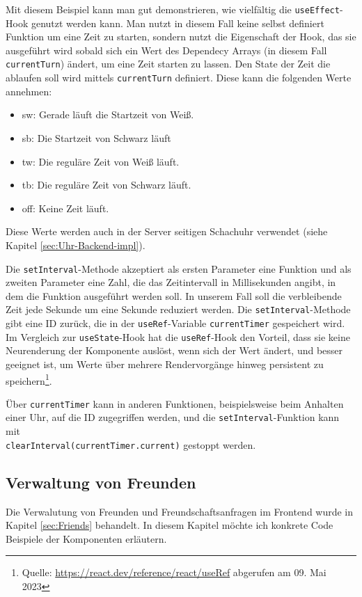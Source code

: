 Mit diesem Beispiel kann man gut demonstrieren, wie vielfältig die \verb|useEffect|-Hook genutzt werden kann. Man nutzt in diesem Fall keine selbst definiert Funktion um eine Zeit zu starten, sondern nutzt die Eigenschaft der Hook, das sie ausgeführt wird sobald sich ein Wert des Dependecy Arrays (in diesem Fall \verb|currentTurn|) ändert, um eine Zeit starten zu lassen. Den State der Zeit die ablaufen soll wird mittels \verb|currentTurn| definiert. Diese kann die folgenden Werte annehmen:

\begin{itemize}
\item \glqq sw\grqq : Gerade läuft die Startzeit von Weiß.
\item \glqq sb\grqq : Die Startzeit von Schwarz läuft
\item \glqq tw\grqq : Die reguläre Zeit von Weiß läuft.
\item \glqq tb\grqq : Die reguläre Zeit von Schwarz läuft.
\item \glqq off\grqq : Keine Zeit läuft.
\end{itemize}

Diese Werte werden auch in der Server seitigen Schachuhr verwendet (siehe Kapitel \ref{sec:Uhr-Backend-impl}).

Die \verb|setInterval|-Methode akzeptiert als ersten Parameter eine Funktion und als zweiten Parameter eine Zahl, die das Zeitintervall in Millisekunden angibt, in dem die Funktion ausgeführt werden soll. In unserem Fall soll die verbleibende Zeit jede Sekunde um eine Sekunde reduziert werden. Die \verb|setInterval|-Methode gibt eine ID zurück, die in der \verb|useRef|-Variable \verb|currentTimer| gespeichert wird. Im Vergleich zur \verb|useState|-Hook hat die \verb|useRef|-Hook den Vorteil, dass sie keine Neurenderung der Komponente auslöst, wenn sich der Wert ändert, und besser geeignet ist, um Werte über mehrere Rendervorgänge hinweg persistent zu speichern\footnote{Quelle: \url{https://react.dev/reference/react/useRef} abgerufen am 09. Mai 2023}.

Über \verb|currentTimer| kann in anderen Funktionen, beispielsweise beim Anhalten einer Uhr, auf die ID zugegriffen werden, und die \verb|setInterval|-Funktion kann mit \\ \verb|clearInterval(currentTimer.current)| gestoppt werden.


\subsection{Verwaltung von Freunden}
Die Verwalutung von Freunden und Freundschaftsanfragen im Frontend wurde in Kapitel \ref{sec:Friends} behandelt. In diesem Kapitel möchte ich konkrete Code Beispiele der Komponenten erläutern.

